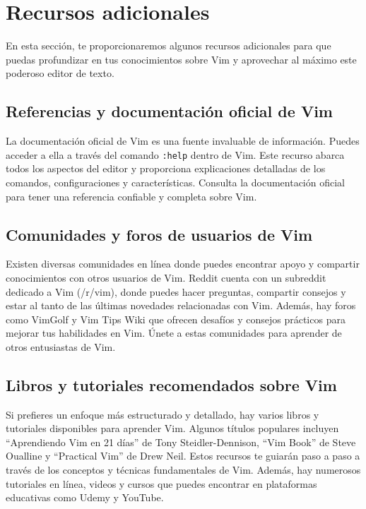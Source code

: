 \documentclass[
  doc,
  floatsintext,
  longtable,
  a4paper,
  nolmodern,
  notxfonts,
  notimes,
  12pt,
  colorlinks=true,linkcolor=blue,citecolor=blue,urlcolor=blue]{apa7}
\begin{document}
\section{Recursos adicionales}\label{recursos-adicionales}

En esta sección, te proporcionaremos algunos recursos adicionales para
que puedas profundizar en tus conocimientos sobre Vim y aprovechar al
máximo este poderoso editor de texto.

\subsection{Referencias y documentación oficial de
Vim}\label{referencias-y-documentaciuxf3n-oficial-de-vim}

La documentación oficial de Vim es una fuente invaluable de información.
Puedes acceder a ella a través del comando \texttt{:help} dentro de Vim.
Este recurso abarca todos los aspectos del editor y proporciona
explicaciones detalladas de los comandos, configuraciones y
características. Consulta la documentación oficial para tener una
referencia confiable y completa sobre Vim.

\subsection{Comunidades y foros de usuarios de
Vim}\label{comunidades-y-foros-de-usuarios-de-vim}

Existen diversas comunidades en línea donde puedes encontrar apoyo y
compartir conocimientos con otros usuarios de Vim. Reddit cuenta con un
subreddit dedicado a Vim (/r/vim), donde puedes hacer preguntas,
compartir consejos y estar al tanto de las últimas novedades
relacionadas con Vim. Además, hay foros como VimGolf y Vim Tips Wiki que
ofrecen desafíos y consejos prácticos para mejorar tus habilidades en
Vim. Únete a estas comunidades para aprender de otros entusiastas de
Vim.

\subsection{Libros y tutoriales recomendados sobre
Vim}\label{libros-y-tutoriales-recomendados-sobre-vim}

Si prefieres un enfoque más estructurado y detallado, hay varios libros
y tutoriales disponibles para aprender Vim. Algunos títulos populares
incluyen ``Aprendiendo Vim en 21 días'' de Tony Steidler-Dennison, ``Vim
Book'' de Steve Oualline y ``Practical Vim'' de Drew Neil. Estos
recursos te guiarán paso a paso a través de los conceptos y técnicas
fundamentales de Vim. Además, hay numerosos tutoriales en línea, videos
y cursos que puedes encontrar en plataformas educativas como Udemy y
YouTube.
\end{document}
